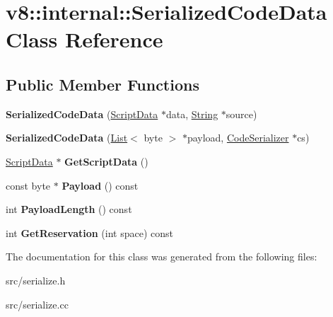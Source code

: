 \hypertarget{classv8_1_1internal_1_1_serialized_code_data}{}\section{v8\+:\+:internal\+:\+:Serialized\+Code\+Data Class Reference}
\label{classv8_1_1internal_1_1_serialized_code_data}
\subsection*{Public Member Functions}
\begin{DoxyCompactItemize}
\item 
\hypertarget{classv8_1_1internal_1_1_serialized_code_data_a0494d5961b6b350bb431a9d62d3501b8}{}{\bfseries Serialized\+Code\+Data} (\hyperlink{classv8_1_1internal_1_1_script_data}{Script\+Data} $\ast$data, \hyperlink{classv8_1_1internal_1_1_string}{String} $\ast$source)\label{classv8_1_1internal_1_1_serialized_code_data_a0494d5961b6b350bb431a9d62d3501b8}

\item 
\hypertarget{classv8_1_1internal_1_1_serialized_code_data_add82c9b8d0dde7ca7c29fb89a0b682ff}{}{\bfseries Serialized\+Code\+Data} (\hyperlink{classv8_1_1internal_1_1_list}{List}$<$ byte $>$ $\ast$payload, \hyperlink{classv8_1_1internal_1_1_code_serializer}{Code\+Serializer} $\ast$cs)\label{classv8_1_1internal_1_1_serialized_code_data_add82c9b8d0dde7ca7c29fb89a0b682ff}

\item 
\hypertarget{classv8_1_1internal_1_1_serialized_code_data_aca5ba4f0cb2bc9778b9f2935ca69982a}{}\hyperlink{classv8_1_1internal_1_1_script_data}{Script\+Data} $\ast$ {\bfseries Get\+Script\+Data} ()\label{classv8_1_1internal_1_1_serialized_code_data_aca5ba4f0cb2bc9778b9f2935ca69982a}

\item 
\hypertarget{classv8_1_1internal_1_1_serialized_code_data_af6fc436b3fac056b445d8428453c0333}{}const byte $\ast$ {\bfseries Payload} () const \label{classv8_1_1internal_1_1_serialized_code_data_af6fc436b3fac056b445d8428453c0333}

\item 
\hypertarget{classv8_1_1internal_1_1_serialized_code_data_acdce0196ba34656ce80159c50f348d5a}{}int {\bfseries Payload\+Length} () const \label{classv8_1_1internal_1_1_serialized_code_data_acdce0196ba34656ce80159c50f348d5a}

\item 
\hypertarget{classv8_1_1internal_1_1_serialized_code_data_a0c25dc6e268ca43834bae83a2995b9a0}{}int {\bfseries Get\+Reservation} (int space) const \label{classv8_1_1internal_1_1_serialized_code_data_a0c25dc6e268ca43834bae83a2995b9a0}

\end{DoxyCompactItemize}


The documentation for this class was generated from the following files\+:\begin{DoxyCompactItemize}
\item 
src/serialize.\+h\item 
src/serialize.\+cc\end{DoxyCompactItemize}
